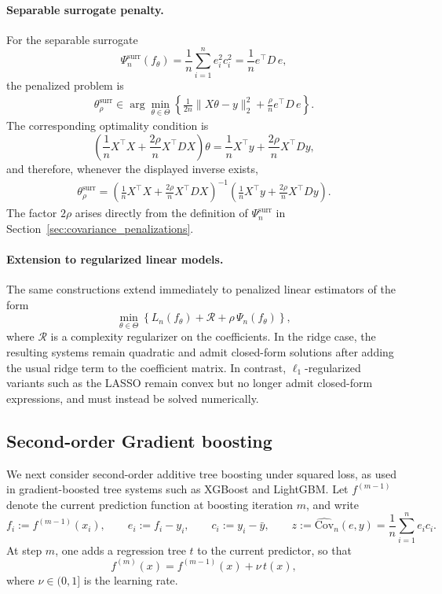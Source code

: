 \documentclass[12pt, draft]{article}
\theoremstyle{plain}
\theoremstyle{definition}
\newcommand{\1}{\mathbf{1}}
\newcommand{\Cov}{\text{Cov}}
\begin{document}
\paragraph{Separable surrogate penalty.}
For the separable surrogate
\[
\Psi_n^{\mathrm{surr}}(f_\theta)
=
\frac{1}{n}\sum_{i=1}^n e_i^2 c_i^2
=
\frac{1}{n}e^\top D\,e,
\]
the penalized problem is
\begin{align}
    \label{opt:linear_surr}
    \theta_{\rho}^{\mathrm{surr}}
    \in
    \arg\min_{\theta\in\Theta}
    \left\{
        \frac{1}{2n}\|X\theta-y\|_2^2
        +
        \frac{\rho}{n}e^\top D\,e
    \right\}.
\end{align}
The corresponding optimality condition is
\[
\left(
\frac{1}{n}X^\top X
+
\frac{2\rho}{n}X^\top D X
\right)\theta
=
\frac{1}{n}X^\top y
+
\frac{2\rho}{n}X^\top D y,
\]
and therefore, whenever the displayed inverse exists,
\begin{align}
    \label{eq:linear_surr_closed_form}
    \theta_{\rho}^{\mathrm{surr}}
    =
    \left(
        \frac{1}{n}X^\top X
        +
        \frac{2\rho}{n}X^\top D X
    \right)^{-1}
    \left(
        \frac{1}{n}X^\top y
        +
        \frac{2\rho}{n}X^\top D y
    \right).
\end{align}
The factor \(2\rho\) arises directly from the definition of \(\Psi_n^{\mathrm{surr}}\) in Section~\ref{sec:covariance_penalizations}.

\paragraph{Extension to regularized linear models.}
The same constructions extend immediately to penalized linear estimators of the form
\[
\min_{\theta\in\Theta}
\left\{
    L_n(f_\theta) + \mathcal{R} + \rho\,\Psi_n(f_\theta)
\right\},
\]
where \(\mathcal{R}\) is a complexity regularizer on the coefficients. In the ridge case, the resulting systems remain quadratic and admit closed-form solutions after adding the usual ridge term to the coefficient matrix. In contrast, \(\ell_1\)-regularized variants such as the LASSO remain convex but no longer admit closed-form expressions, and must instead be solved numerically.

\subsection{Second-order Gradient boosting}
\label{subsec:tree_boosting}

We next consider second-order additive tree boosting under squared loss, as used in gradient-boosted tree systems such as XGBoost and LightGBM. Let \(f^{(m-1)}\) denote the current prediction function at boosting iteration \(m\), and write
\[
f_i := f^{(m-1)}(x_i),
\qquad
e_i := f_i - y_i,
\qquad
c_i := y_i - \bar y,
\qquad
z := \widehat{\Cov}_n(e,y) = \frac{1}{n}\sum_{i=1}^n e_i c_i.
\]
At step \(m\), one adds a regression tree \(t\) to the current predictor, so that
\[
f^{(m)}(x) = f^{(m-1)}(x) + \nu\,t(x),
\]
where \(\nu\in(0,1]\) is the learning rate.
\end{document}
